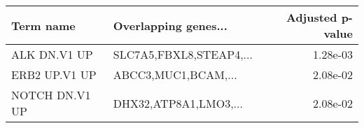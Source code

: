 \begin{tabular}{llr}
\toprule
     Term name &    Overlapping genes... &  Adjusted p-value \\
\midrule
  ALK DN.V1 UP & SLC7A5,FBXL8,STEAP4,... &          1.28e-03 \\
 ERB2 UP.V1 UP &     ABCC3,MUC1,BCAM,... &          2.08e-02 \\
NOTCH DN.V1 UP &   DHX32,ATP8A1,LMO3,... &          2.08e-02 \\
\bottomrule
\end{tabular}

